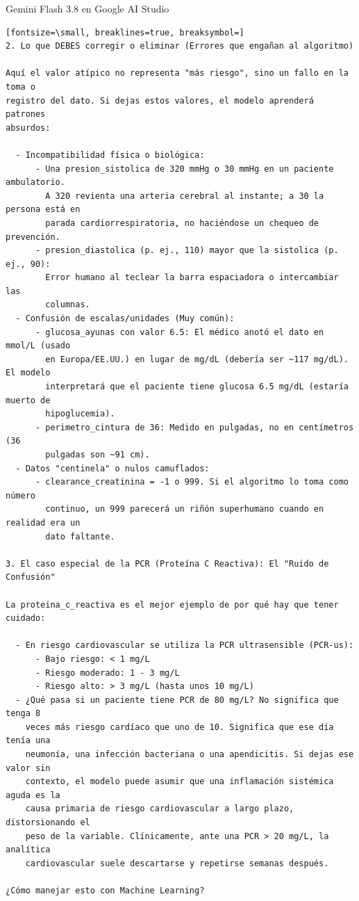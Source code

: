 \documentclass[12pt,a4paper,oneside]{book}
\begin{document}
\begin{iaresp}{Gemini Flash 3.8 en Google AI Studio}
\begin{Verbatim}[fontsize=\small, breaklines=true, breaksymbol=]
2. Lo que DEBES corregir o eliminar (Errores que engañan al algoritmo)

Aquí el valor atípico no representa "más riesgo", sino un fallo en la toma o
registro del dato. Si dejas estos valores, el modelo aprenderá patrones
absurdos:

  - Incompatibilidad física o biológica:
      - Una presion_sistolica de 320 mmHg o 30 mmHg en un paciente ambulatorio.
        A 320 revienta una arteria cerebral al instante; a 30 la persona está en
        parada cardiorrespiratoria, no haciéndose un chequeo de prevención.
      - presion_diastolica (p. ej., 110) mayor que la sistolica (p. ej., 90):
        Error humano al teclear la barra espaciadora o intercambiar las
        columnas.
  - Confusión de escalas/unidades (Muy común):
      - glucosa_ayunas con valor 6.5: El médico anotó el dato en mmol/L (usado
        en Europa/EE.UU.) en lugar de mg/dL (debería ser ~117 mg/dL). El modelo
        interpretará que el paciente tiene glucosa 6.5 mg/dL (estaría muerto de
        hipoglucemia).
      - perimetro_cintura de 36: Medido en pulgadas, no en centímetros (36
        pulgadas son ~91 cm).
  - Datos "centinela" o nulos camuflados:
      - clearance_creatinina = -1 o 999. Si el algoritmo lo toma como número
        continuo, un 999 parecerá un riñón superhumano cuando en realidad era un
        dato faltante.

3. El caso especial de la PCR (Proteína C Reactiva): El "Ruido de Confusión"

La proteina_c_reactiva es el mejor ejemplo de por qué hay que tener cuidado:

  - En riesgo cardiovascular se utiliza la PCR ultrasensible (PCR-us):
      - Bajo riesgo: < 1 mg/L
      - Riesgo moderado: 1 - 3 mg/L
      - Riesgo alto: > 3 mg/L (hasta unos 10 mg/L)
  - ¿Qué pasa si un paciente tiene PCR de 80 mg/L? No significa que tenga 8
    veces más riesgo cardíaco que uno de 10. Significa que ese día tenía una
    neumonía, una infección bacteriana o una apendicitis. Si dejas ese valor sin
    contexto, el modelo puede asumir que una inflamación sistémica aguda es la
    causa primaria de riesgo cardiovascular a largo plazo, distorsionando el
    peso de la variable. Clínicamente, ante una PCR > 20 mg/L, la analítica
    cardiovascular suele descartarse y repetirse semanas después.

¿Cómo manejar esto con Machine Learning?


\end{Verbatim}
\end{iaresp}
\end{document}

